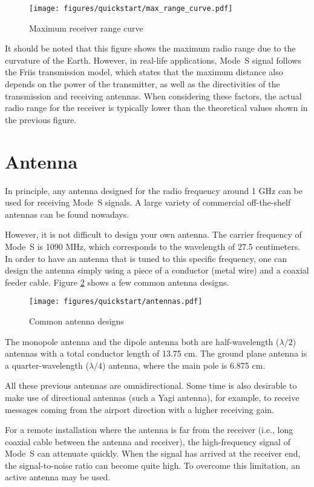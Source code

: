 \begin{figure}[ht]
  \centering
  \texttt{[image: figures/quickstart/max\_range\_curve.pdf]}
  \caption{Maximum receiver range curve}
  \label{fig:max_range_curve}
\end{figure}


It should be noted that this figure shows the maximum radio range due to the curvature of the Earth. However, in real-life applications, Mode~S signal follows the Friis transmission model, which states that the maximum distance also depends on the power of the transmitter, as well as the directivities of the transmission and receiving antennas. When considering these factors, the actual radio range for the receiver is typically lower than the theoretical values shown in the previous figure.

\section{Antenna}
In principle, any antenna designed for the radio frequency around 1 GHz can be used for receiving Mode~S signals. A large variety of commercial off-the-shelf antennas can be found nowadays. 

However, it is not difficult to design your own antenna. The carrier frequency of Mode~S is 1090 MHz, which corresponds to the wavelength of 27.5 centimeters. In order to have an antenna that is tuned to this specific frequency, one can design the antenna simply using a piece of a conductor (metal wire) and a coaxial feeder cable. Figure \ref{fig:antennas} shows a few common antenna designs.

\begin{figure}[ht]
  \centering
  \texttt{[image: figures/quickstart/antennas.pdf]}
  \caption{Common antenna designs}
  \label{fig:antennas}
\end{figure}

The monopole antenna and the dipole antenna both are half-wavelength ($\lambda/2$) antennas with a total conductor length of 13.75 cm. The ground plane antenna is a quarter-wavelength ($\lambda/4$) antenna, where the main pole is 6.875 cm.

All these previous antennas are omnidirectional. Some time is also desirable to make use of directional antennas (such a Yagi antenna), for example, to receive messages coming from the airport direction with a higher receiving gain.

For a remote installation where the antenna is far from the receiver (i.e., long coaxial cable between the antenna and receiver), the high-frequency signal of Mode~S can attenuate quickly. When the signal has arrived at the receiver end, the signal-to-noise ratio can become quite high. To overcome this limitation, an active antenna may be used.


